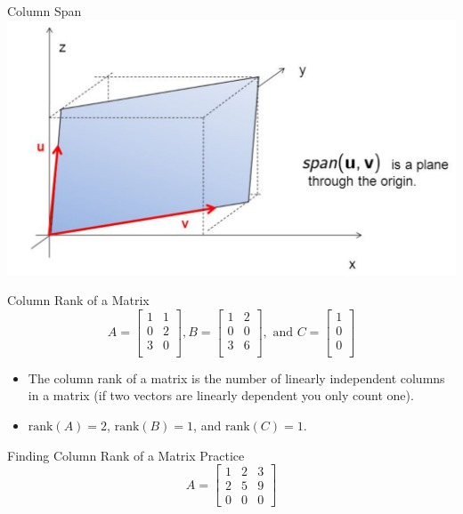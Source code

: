 \documentclass[aspectratio=43]{beamer}
\begin{document}
\begin{frame}{Column Span}
  \includegraphics[width= \linewidth]{span_2.png}
\end{frame}

\begin{frame}{Column Rank of a Matrix}
  $$
    A = \begin{bmatrix}
      1 & 1 \\
      0 & 2 \\
      3 & 0 \\
    \end{bmatrix},
    B = \begin{bmatrix}
      1 & 2 \\
      0 & 0 \\
      3 & 6 \\
    \end{bmatrix}, \text{ and }
    C = \begin{bmatrix}
      1 \\ 0 \\ 0\\
    \end{bmatrix}
  $$
  \begin{itemize}
    \item The \alert{column rank} of a matrix is the number of linearly independent columns in a matrix (if two vectors are linearly dependent you only count one).

    \item $\text{rank}(A) = 2$, $\text{rank}(B) = 1$, and $\text{rank}(C) = 1$.
  \end{itemize}
\end{frame}

\begin{frame}{Finding Column Rank of a Matrix Practice}
  $$A = \begin{bmatrix}
      1 & 2 & 3 \\
      2 & 5 & 9 \\
      0 & 0 & 0
    \end{bmatrix}
  $$

  \vspace{50mm}
\end{frame}
\end{document}
